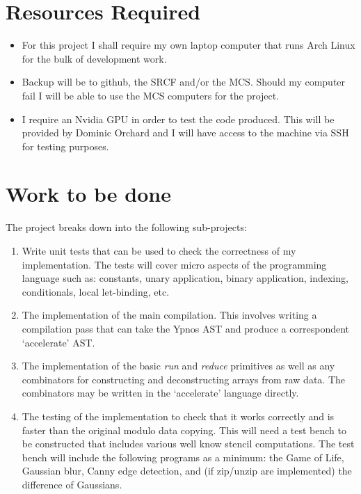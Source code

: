 \section*{Resources Required}

\begin{itemize}

\item For this project I shall require my own laptop computer that runs Arch
Linux for the bulk of development work.

\item Backup will be to github, the SRCF and/or the MCS. Should my computer
fail I will be able to use the MCS computers for the project.

\item I require an Nvidia GPU in order to test the code produced. This will be
provided by Dominic Orchard and I will have access to the machine via SSH for
testing purposes.

\end{itemize}

\section*{Work to be done}

The project breaks down into the following sub-projects:

\begin{enumerate}

\item Write unit tests that can be used to check the correctness of my
implementation. The tests will cover micro aspects of the programming language
such as: constants, unary application, binary application, indexing,
conditionals, local let-binding, etc.

\item The implementation of the main compilation. This involves writing a
compilation pass that can take the Ypnos AST and produce a correspondent
`accelerate' AST.

\item The implementation of the basic \emph{run} and \emph{reduce} primitives
as well as any combinators for constructing and deconstructing arrays from raw
data. The combinators may be written in the `accelerate' language directly.

\item The testing of the implementation to check that it works correctly and is
faster than the original modulo data copying. This will need a test bench to be
constructed that includes various well know stencil computations. The test
bench will include the following programs as a minimum: the Game of Life,
Gaussian blur, Canny edge detection, and (if zip/unzip are implemented) the
difference of Gaussians.

\end{enumerate}

